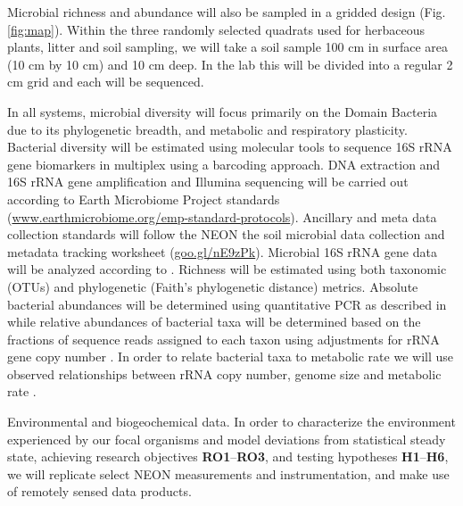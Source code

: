 \documentclass[11pt]{article}
\makeatletter
\renewcommand{\paragraph}{\@startsection{paragraph}{4}{\z@}
  {1ex \@plus 1ex \@minus .2ex}{-1em}
  {\normalfont\normalsize\it}
}
\makeatother
\begin{document}
Microbial richness and abundance will also be sampled in a gridded
design (Fig. \ref{fig:map}).  Within the three randomly selected
quadrats used for herbaceous plants, litter and soil sampling, we will
take a soil sample 100 cm in surface area (10 cm by 10 cm) and 10 cm
deep.  In the lab this will be divided into a regular 2 cm grid and
each will be sequenced.  

In all systems, microbial diversity will focus primarily on the Domain
Bacteria due to its phylogenetic breadth, and metabolic and
respiratory plasticity. Bacterial diversity will be estimated using
molecular tools to sequence 16S rRNA gene biomarkers in multiplex
using a barcoding approach. DNA extraction and 16S rRNA gene
amplification and Illumina sequencing will be carried out according to
Earth Microbiome Project standards
(\url{www.earthmicrobiome.org/emp-standard-protocols}). Ancillary
and meta data collection standards will follow the NEON the soil
microbial data collection and metadata tracking worksheet
(\url{goo.gl/nE9zPk}).  Microbial 16S rRNA gene data will be
analyzed according to \citet{shi2015}. Richness will be estimated
using both taxonomic (OTUs) and phylogenetic (Faith's phylogenetic
distance) metrics. Absolute bacterial abundances will be determined
using quantitative PCR as described in \citep{shi2015} while relative
abundances of bacterial taxa will be determined based on the fractions
of sequence reads assigned to each taxon using adjustments for rRNA
gene copy number \citep{kembel2012}.  In order to relate bacterial
taxa to metabolic rate we will use observed relationships between rRNA
copy number, genome size and metabolic rate \citep{delong2010}.

\paragraph{Environmental and biogeochemical data.}
In order to characterize the environment experienced by our focal
organisms and model deviations from statistical steady state,
achieving research objectives {\bf RO1}--{\bf RO3}, and testing
hypotheses {\bf H1}--{\bf H6}, we will replicate select NEON
measurements and instrumentation, and make use of remotely sensed data
products.
\end{document}
